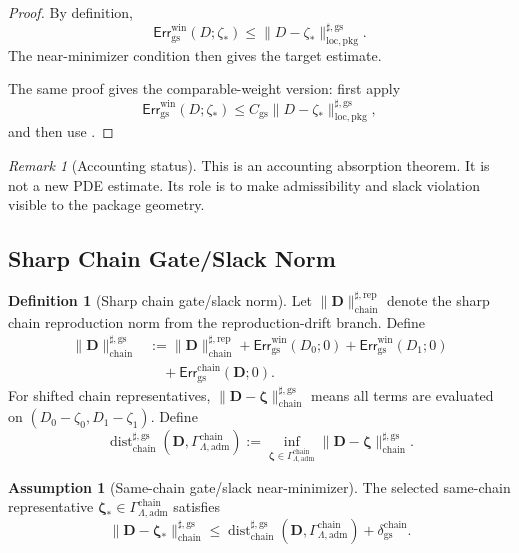 \documentclass[11pt]{article}
\numberwithin{equation}{section}
\theoremstyle{definition}
\newtheorem{definition}[definition]{Definition}
\newtheorem{assumption}[assumption]{Assumption}
\theoremstyle{remark}
\newtheorem{remark}[remark]{Remark}
\newcommand{\loc}{\mathrm{loc}}
\newcommand{\pkg}{\mathrm{pkg}}
\newcommand{\adm}{\mathrm{adm}}
\newcommand{\rep}{\mathrm{rep}}
\newcommand{\gs}{\mathrm{gs}}
\newcommand{\chain}{\mathrm{chain}}
\newcommand{\Err}{\mathsf{Err}}
\newcommand{\Dist}{\operatorname{dist}}
\newcommand{\bD}{\mathbf D}
\newcommand{\bzeta}{\boldsymbol\zeta}
\newcommand{\Gchain}{\Gamma_{\Lambda,\adm}^{\chain}}
\begin{document}
\begin{proof}
By definition,
\[
    \Err_{\gs}^{\mathrm{win}}(D;\zeta_*)
    \le
    \|D-\zeta_*\|_{\loc,\pkg}^{\sharp,\gs}.
\]
The near-minimizer condition then gives the target estimate.

The same proof gives the comparable-weight version: first apply
\[
    \Err_{\gs}^{\mathrm{win}}(D;\zeta_*)
    \le
    C_{\gs}\|D-\zeta_*\|_{\loc,\pkg}^{\sharp,\gs},
\]
and then use .
\end{proof}

\begin{remark}[Accounting status]
This is an accounting absorption theorem.  It is not a new PDE estimate.  Its
role is to make admissibility and slack violation visible to the package
geometry.
\end{remark}

\subsection{Sharp Chain Gate/Slack Norm}
\label{gs:sec:chain-norm}

\begin{definition}[Sharp chain gate/slack norm]
\label{gs:def:sharp-chain-gs-norm}
Let \(\|\bD\|_{\chain}^{\sharp,\rep}\) denote the sharp chain reproduction norm
from the reproduction-drift branch.  Define
\[
\begin{aligned}
    \|\bD\|_{\chain}^{\sharp,\gs}
    &:=
    \|\bD\|_{\chain}^{\sharp,\rep}
    +
    \Err_{\gs}^{\mathrm{win}}(D_0;0)
    +
    \Err_{\gs}^{\mathrm{win}}(D_1;0)\\
    &\quad+
    \Err_{\gs}^{\chain}(\bD;0).
\end{aligned}
\]
For shifted chain representatives,
\(\|\bD-\bzeta\|_{\chain}^{\sharp,\gs}\) means all terms are evaluated on
\((D_0-\zeta_0,D_1-\zeta_1)\).  Define
\[
    \Dist_{\chain}^{\sharp,\gs}(\bD,\Gchain)
    :=
    \inf_{\bzeta\in\Gchain}
    \|\bD-\bzeta\|_{\chain}^{\sharp,\gs}.
\]
\end{definition}

\begin{assumption}[Same-chain gate/slack near-minimizer]
\label{gs:ass:chain-gs-near-minimizer}
The selected same-chain representative \(\bzeta_*\in\Gchain\) satisfies
\[
    \|\bD-\bzeta_*\|_{\chain}^{\sharp,\gs}
    \le
    \Dist_{\chain}^{\sharp,\gs}(\bD,\Gchain)
    +
    \delta_{\gs}^{\chain}.
\]
\end{assumption}
\end{document}
